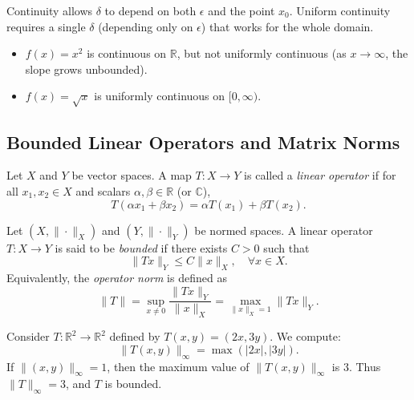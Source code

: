 \begin{remark}
Continuity allows $\delta$ to depend on both $\epsilon$ and the point $x_0$.  
Uniform continuity requires a single $\delta$ (depending only on $\epsilon$) that works for the whole domain.  
\end{remark}

\begin{example}
\begin{itemize}
    \item $f(x) = x^2$ is continuous on $\mathbb{R}$, but not uniformly continuous (as $x \to \infty$, the slope grows unbounded).  
    \item $f(x) = \sqrt{x}$ is uniformly continuous on $[0,\infty)$.  
\end{itemize}
\end{example}

\subsection{Bounded Linear Operators and Matrix Norms}

\begin{definition}
Let $X$ and $Y$ be vector spaces.  
A map $T:X \to Y$ is called a \emph{linear operator} if for all $x_1,x_2 \in X$ and scalars $\alpha,\beta \in \mathbb{R}$ (or $\mathbb{C}$),
\begin{equation}
T(\alpha x_1 + \beta x_2) = \alpha T(x_1) + \beta T(x_2).
\end{equation}
\end{definition}

\begin{definition}
Let $(X,\|\cdot\|_X)$ and $(Y,\|\cdot\|_Y)$ be normed spaces.  
A linear operator $T:X \to Y$ is said to be \emph{bounded} if there exists $C>0$ such that
\begin{equation}
\|Tx\|_Y \leq C \|x\|_X, \quad \forall x \in X.
\end{equation}
Equivalently, the \emph{operator norm} is defined as
\begin{equation}
\|T\| = \sup_{x \neq 0} \frac{\|Tx\|_Y}{\|x\|_X} 
= \max_{\|x\|_X = 1} \|Tx\|_Y.
\end{equation}
\end{definition}

\begin{example}
Consider $T:\mathbb{R}^2 \to \mathbb{R}^2$ defined by $T(x,y) = (2x,3y)$.  
We compute:
\begin{equation}
\|T(x,y)\|_\infty = \max(|2x|,|3y|).
\end{equation}
If $\|(x,y)\|_\infty = 1$, then the maximum value of $\|T(x,y)\|_\infty$ is $3$.  
Thus $\|T\|_\infty = 3$, and $T$ is bounded.  
\end{example}

